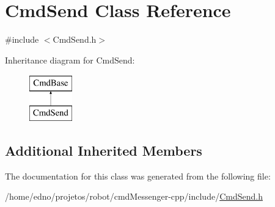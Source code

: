 \hypertarget{class_cmd_send}{\section{Cmd\+Send Class Reference}
\label{class_cmd_send}
}


{\ttfamily \#include $<$Cmd\+Send.\+h$>$}

Inheritance diagram for Cmd\+Send\+:\begin{figure}[H]
\begin{center}
\leavevmode
\includegraphics[height=2.000000cm]{class_cmd_send}
\end{center}
\end{figure}
\subsection*{Additional Inherited Members}


The documentation for this class was generated from the following file\+:\begin{DoxyCompactItemize}
\item 
/home/edno/projetos/robot/cmd\+Messenger-\/cpp/include/\hyperlink{_cmd_send_8h}{Cmd\+Send.\+h}\end{DoxyCompactItemize}
